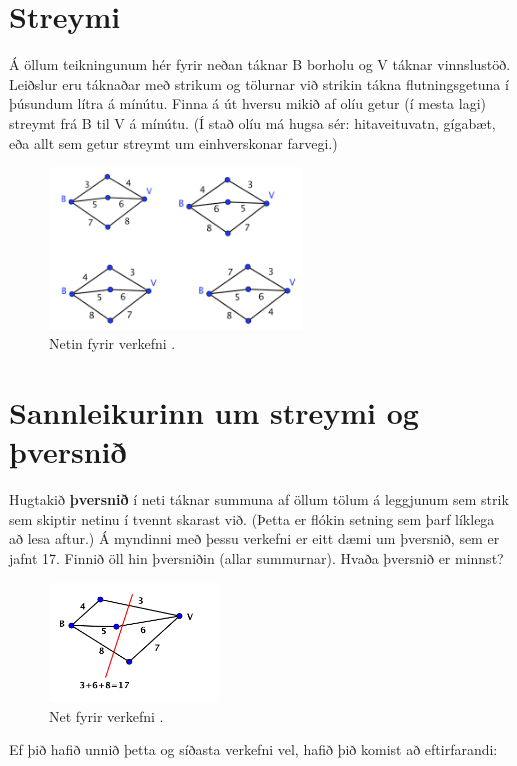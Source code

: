 \documentclass[b5paper,12pt]{book}
\renewcommand*\thesection{\arabic{section}}
\begin{document}
\section{Streymi}
\label{sec:streymi}
Á öllum teikningunum hér fyrir neðan táknar B borholu og V táknar vinnslustöð. Leiðslur eru táknaðar með strikum og tölurnar við strikin tákna flutningsgetuna í þúsundum lítra á mínútu. Finna á út hversu mikið af olíu getur (í mesta lagi) streymt frá B til V á mínútu. (Í stað olíu má hugsa sér: hitaveituvatn, gígabæt, eða allt sem getur streymt um einhverskonar farvegi.)
\begin{figure}[h]
  \includegraphics[width=0.6\textwidth, center]{Myndir/Flaedi1.png}
  \caption*{Netin fyrir verkefni \thesection{}.}
\end{figure}

\section{Sannleikurinn um streymi og þversnið}
Hugtakið \textbf{þversnið} í neti táknar summuna af öllum tölum á leggjunum sem strik sem skiptir netinu í tvennt skarast við. (Þetta er flókin setning sem þarf líklega að lesa aftur.) Á myndinni með þessu verkefni er eitt dæmi um þversnið, sem er jafnt 17. Finnið öll hin þversniðin (allar summurnar). Hvaða þversnið er minnst? 
\begin{figure}[h]
  \includegraphics[width=0.4\textwidth, center]{Myndir/Thversnid.png}
  \caption*{Net fyrir verkefni \thesection{}.}
\end{figure}

Ef þið hafið unnið þetta og síðasta verkefni vel, hafið þið komist að eftirfarandi:\\
\end{document}
